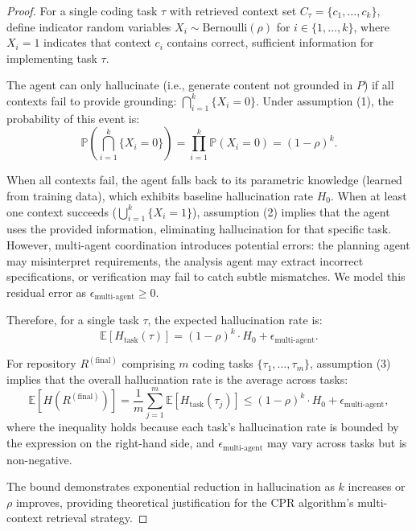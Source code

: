 \documentclass{ieeeaccess}
\begin{document}
\begin{proof}
For a single coding task \(\tau\) with retrieved context set \(C_\tau = \{c_1, \ldots, c_k\}\), define indicator random variables \(X_i \sim \text{Bernoulli}(\rho)\) for \(i \in \{1, \ldots, k\}\), where \(X_i = 1\) indicates that context \(c_i\) contains correct, sufficient information for implementing task \(\tau\).

The agent can only hallucinate (i.e., generate content not grounded in \(P\)) if all contexts fail to provide grounding: \(\bigcap_{i=1}^k \{X_i = 0\}\). Under assumption (1), the probability of this event is:
\begin{equation}
\mathbb{P}\left(\bigcap_{i=1}^k \{X_i = 0\}\right) = \prod_{i=1}^k \mathbb{P}(X_i = 0) = (1-\rho)^k.
\end{equation}

When all contexts fail, the agent falls back to its parametric knowledge (learned from training data), which exhibits baseline hallucination rate \(H_0\). When at least one context succeeds (\(\bigcup_{i=1}^k \{X_i = 1\}\)), assumption (2) implies that the agent uses the provided information, eliminating hallucination for that specific task. However, multi-agent coordination introduces potential errors: the planning agent may misinterpret requirements, the analysis agent may extract incorrect specifications, or verification may fail to catch subtle mismatches. We model this residual error as \(\epsilon_{\text{multi-agent}} \geq 0\).

Therefore, for a single task \(\tau\), the expected hallucination rate is:
\begin{equation}
\mathbb{E}[H_{\text{task}}(\tau)] = (1-\rho)^k \cdot H_0 + \epsilon_{\text{multi-agent}}.
\end{equation}

For repository \(R^{(\text{final})}\) comprising \(m\) coding tasks \(\{\tau_1, \ldots, \tau_m\}\), assumption (3) implies that the overall hallucination rate is the average across tasks:
\begin{equation}
\mathbb{E}[H(R^{(\text{final})})] = \frac{1}{m} \sum_{j=1}^m \mathbb{E}[H_{\text{task}}(\tau_j)] \leq (1-\rho)^k \cdot H_0 + \epsilon_{\text{multi-agent}},
\end{equation}
where the inequality holds because each task's hallucination rate is bounded by the expression on the right-hand side, and \(\epsilon_{\text{multi-agent}}\) may vary across tasks but is non-negative.

The bound demonstrates exponential reduction in hallucination as \(k\) increases or \(\rho\) improves, providing theoretical justification for the CPR algorithm's multi-context retrieval strategy.
\end{proof}
\end{document}
